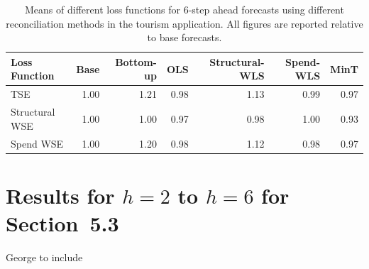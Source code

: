 \documentclass[12pt]{article}
\begin{document}
  \begin{table}[ht]
    \centering
	\begin{tabular}{lrrrrrr}
		\hline
		Loss Function & Base & Bottom-up & OLS & Structural-WLS & Spend-WLS & MinT \\ 
		\hline
		TSE & 1.00 & 1.21 & 0.98 & 1.13 & 0.99 & 0.97 \\ 
		Structural WSE & 1.00 & 1.00 & 0.97 & 0.98 & 1.00 & 0.93 \\ 
		Spend WSE & 1.00 & 1.20 & 0.98 & 1.12 & 0.98 & 0.97 \\ 
		\hline
	\end{tabular}
	\caption{Means of different loss functions for 6-step ahead forecasts using different reconciliation methods in the tourism application.  All figures are reported relative to base forecasts.}
	\label{tab:sec52h6} 
  \end{table}

  \section{Results for $h=2$ to $h=6$ for Section~5.3}
  
  George to include
   
\end{document}
